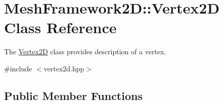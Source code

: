 \hypertarget{classMeshFramework2D_1_1Vertex2D}{}\section{Mesh\+Framework2D\+:\+:Vertex2D Class Reference}
\label{classMeshFramework2D_1_1Vertex2D}


The \hyperlink{classMeshFramework2D_1_1Vertex2D}{Vertex2D} class provides description of a vertex.  




{\ttfamily \#include $<$vertex2d.\+hpp$>$}

\subsection*{Public Member Functions}
